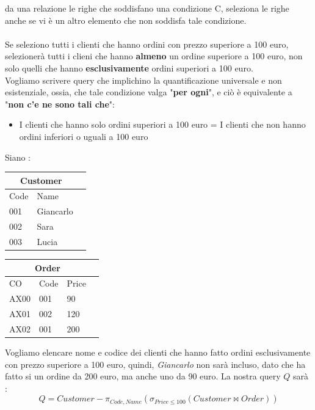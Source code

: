 \documentclass[12pt, letterpaper]{article}
\begin{document}
da una relazione le righe che soddisfano una condizione C, seleziona le righe anche se vi è un altro 
elemento che non soddisfa tale condizione.\\\hphantom{.}\\ Se seleziono tutti i clienti che hanno ordini con 
prezzo superiore a 100 euro, selezionerà tutti i clieni che hanno \textbf{almeno} un ordine 
superiore a 100 euro, non solo quelli che hanno \textbf{esclusivamente} ordini superiori a 100 euro.
\\ Vogliamo scrivere query che implichino la quantificazione universale e non esistenziale, ossia, 
che tale condizione valga "\textbf{per ogni}", e ciò è equivalente a "\textbf{non c'e ne sono tali che}":
\begin{itemize}
    \item I clienti che hanno solo ordini superiori a 100 euro = I clienti che non hanno ordini inferiori o uguali a 100 euro
\end{itemize}
\begin{center}
    Siano : 
    \begin{tabular}{|l|l|r|}
        \hline
    \multicolumn{2}{|c|}{\textbf{Customer}}\\
        \hline
        Code & Name  \\
        \hline
        001 & Giancarlo  \\
        \hline
        002 & Sara  \\
        \hline
        003 & Lucia  \\
        \hline
        \end{tabular}
        \begin{tabular}{|l|l|l|r|}
            \hline
        \multicolumn{3}{|c|}{\textbf{Order}}\\
            \hline
            CO & Code & Price  \\
            \hline
            AX00 & 001 & 90 \\
            \hline
            AX01 & 002 & 120 \\
            \hline
            AX02 & 001 & 200 \\
            \hline
            \end{tabular}
\end{center}
Vogliamo elencare nome e codice dei clienti che hanno fatto ordini esclusivamente con prezzo superiore a 100 euro, quindi, 
\textit{Giancarlo} non sarà incluso, dato che ha fatto si un ordine da 200 euro, ma anche uno da 90 euro.
La nostra query \(Q\) sarà :
\begin{equation}
    Q = Customer-\pi_{Code,Name}(\sigma_{Price\le 100}(Customer \Join Order))
\end{equation}
\end{document}
